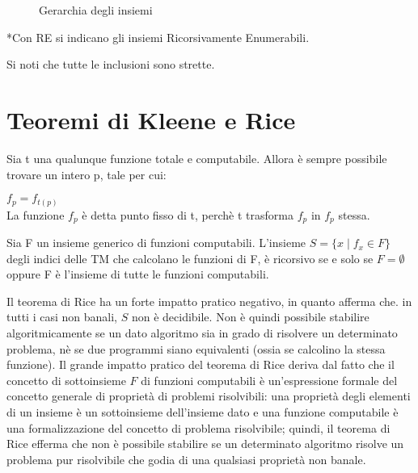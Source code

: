   \begin{figure}[!h]
    \begin{center}    
    \end{center}
    \caption{Gerarchia degli insiemi}    
  \end{figure}

  *Con RE si indicano gli insiemi Ricorsivamente Enumerabili.

  Si noti che tutte le inclusioni sono strette.

  \section{Teoremi di Kleene e Rice}

  \begin{theorem} 
    Sia t una qualunque funzione totale e computabile. Allora è sempre possibile trovare un intero p, tale per cui:
    
    \(f_p=f_{t(p)}\)\\
    La funzione \(f_p\) è detta punto fisso di t, perchè t trasforma \(f_p\) in \(f_p\) stessa.
  \end{theorem}

  \begin{theorem}
    Sia F un insieme generico di funzioni computabili. L'insieme \(S=\{x\;|\;f_x\in F\}\) degli indici delle TM che calcolano le funzioni di F, è ricorsivo se e solo se \(F=\emptyset\) oppure F è l'insieme di tutte le funzioni computabili.
  \end{theorem}

  Il teorema di Rice ha un forte impatto pratico negativo, in quanto afferma che. in tutti i casi non banali, \(S\) non è decidibile. Non è quindi possibile stabilire algoritmicamente se un dato algoritmo sia in grado di risolvere un determinato problema, nè se due programmi siano equivalenti (ossia se calcolino la stessa funzione). Il grande impatto pratico del teorema di Rice deriva dal fatto che il concetto di sottoinsieme \(F\) di funzioni computabili è un'espressione formale del concetto generale di proprietà di problemi risolvibili: una proprietà degli elementi di un insieme è un sottoinsieme dell'insieme dato e una funzione computabile è una formalizzazione del concetto di problema risolvibile; quindi, il teorema di Rice efferma che non è possibile stabilire se un determinato algoritmo risolve un problema pur risolvibile che godia di una qualsiasi proprietà non banale.